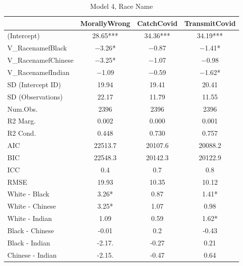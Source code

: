 \documentclass[]{report}
\begin{document}
\begin{table}
	
	\caption{Model 4, Race Name}
	\centering
	\begin{tabular}[t]{lccc}
		\toprule
		& MorallyWrong & CatchCovid & TransmitCovid\\
		\midrule
		(Intercept) & \num{28.65}*** & \num{34.36}*** & \num{34.19}***\\
		V\_RacenamefBlack & \num{-3.26}* & \num{-0.87} & \num{-1.41}*\\
		V\_RacenamefChinese & \num{-3.25}* & \num{-1.07} & \num{-0.98}\\
		V\_RacenamefIndian & \num{-1.09} & \num{-0.59} & \num{-1.62}*\\
		SD (Intercept ID) & \num{19.94} & \num{19.41} & \num{20.41}\\
		SD (Observations) & \num{22.17} & \num{11.79} & \num{11.55}\\
		\midrule
		Num.Obs. & \num{2396} & \num{2396} & \num{2396}\\
		R2 Marg. & \num{0.002} & \num{0.000} & \num{0.001}\\
		R2 Cond. & \num{0.448} & \num{0.730} & \num{0.757}\\
		AIC & \num{22513.7} & \num{20107.6} & \num{20088.2}\\
		BIC & \num{22548.3} & \num{20142.3} & \num{20122.9}\\
		ICC & \num{0.4} & \num{0.7} & \num{0.8}\\
		RMSE & \num{19.93} & \num{10.35} & \num{10.12}\\
		  \midrule
		White - Black & 3.26* & 0.87 & 1.41* \\ 
		White - Chinese & 3.25* & 1.07 & 0.98 \\ 
		White - Indian & 1.09 & 0.59 & 1.62* \\ 
		Black - Chinese & -0.01 & 0.2 & -0.43 \\ 
		Black - Indian & -2.17. & -0.27 & 0.21 \\ 
		Chinese - Indian & -2.15. & -0.47 & 0.64 \\ 
		\bottomrule
	\end{tabular}
\end{table}

\end{document}
